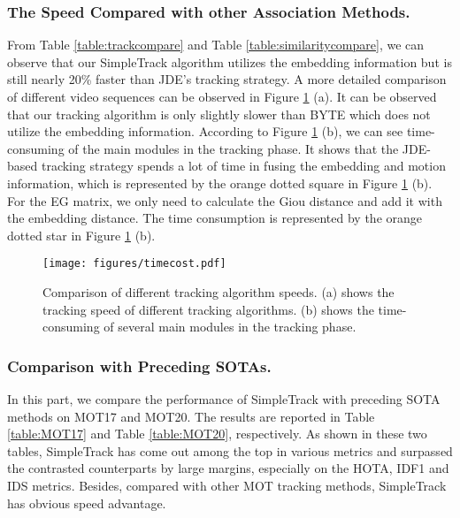 \documentclass[runningheads]{llncs}
\begin{document}
\subsubsection{The Speed Compared with other Association Methods.}
From Table \ref{table:trackcompare} and Table \ref{table:similaritycompare}, we can observe that our SimpleTrack algorithm utilizes the embedding information but is still nearly 20\% faster than JDE's tracking strategy. A more detailed comparison of different video sequences can be observed in Figure \ref{fig:speed} (a). It can be observed that our tracking algorithm is only slightly slower than BYTE which does not utilize the embedding information. According to Figure \ref{fig:speed} (b), we can see time-consuming of the main modules in the tracking phase. It shows that the JDE-based tracking strategy spends a lot of time in fusing the embedding and motion information, which is represented by the orange dotted square in Figure \ref{fig:speed} (b). For the EG matrix, we only need to calculate the Giou distance and add it with the embedding distance. The time consumption is represented by the orange dotted star in Figure \ref{fig:speed} (b).
\begin{figure}
\centering
\texttt{[image: figures/timecost.pdf]}
\caption{Comparison of different tracking algorithm speeds. (a) shows the tracking speed of different tracking algorithms. (b) shows the time-consuming of several main modules in the tracking phase.}
\label{fig:speed}
\end{figure}
\subsubsection{Comparison with Preceding SOTAs.}
In this part, we compare the performance of SimpleTrack with preceding SOTA methods on MOT17 and MOT20. The results are reported in Table \ref{table:MOT17} and Table \ref{table:MOT20}, respectively. As shown in these two tables, SimpleTrack has come out among the top in various metrics and surpassed the contrasted counterparts by large margins, especially on the HOTA, IDF1 and IDS metrics. Besides, compared with other MOT tracking methods, SimpleTrack has obvious speed advantage.
\end{document}
